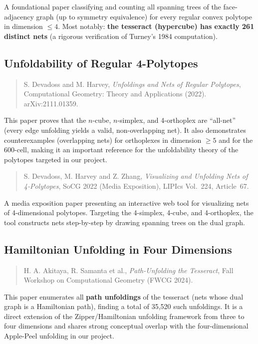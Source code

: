 \documentclass[a4paper,11pt]{article}
\begin{document}
A foundational paper classifying and counting all spanning trees of the face-adjacency graph
(up to symmetry equivalence) for every regular convex polytope in dimension $\leq 4$.
Most notably: \textbf{the tesseract (hypercube) has exactly 261 distinct nets}
(a rigorous verification of Turney's 1984 computation).

\subsection{Unfoldability of Regular 4-Polytopes}

\begin{quotation}\noindent
  S. Devadoss and M. Harvey,
  \textit{Unfoldings and Nets of Regular Polytopes},
  Computational Geometry: Theory and Applications (2022).
  arXiv:2111.01359.
\end{quotation}

This paper proves that the $n$-cube, $n$-simplex, and 4-orthoplex are ``all-net''
(every edge unfolding yields a valid, non-overlapping net).
It also demonstrates counterexamples (overlapping nets) for orthoplexes in dimension $\geq 5$
and for the 600-cell, making it an important reference for the unfoldability theory
of the polytopes targeted in our project.

\begin{quotation}\noindent
  S. Devadoss, M. Harvey and Z. Zhang,
  \textit{Visualizing and Unfolding Nets of 4-Polytopes},
  SoCG 2022 (Media Exposition), LIPIcs Vol.~224, Article~67.
\end{quotation}

A media exposition paper presenting an interactive web tool for visualizing nets of
4-dimensional polytopes.
Targeting the 4-simplex, 4-cube, and 4-orthoplex, the tool constructs nets step-by-step
by drawing spanning trees on the dual graph.

\subsection{Hamiltonian Unfolding in Four Dimensions}

\begin{quotation}\noindent
  H. A. Akitaya, R. Samanta et al.,
  \textit{Path-Unfolding the Tesseract},
  Fall Workshop on Computational Geometry (FWCG 2024).
\end{quotation}

This paper enumerates all \textbf{path unfoldings} of the tesseract (nets whose dual graph
is a Hamiltonian path), finding a total of 35,520 such unfoldings.
It is a direct extension of the Zipper/Hamiltonian unfolding framework from three to four
dimensions and shares strong conceptual overlap with the four-dimensional Apple-Peel unfolding
in our project.
\end{document}
